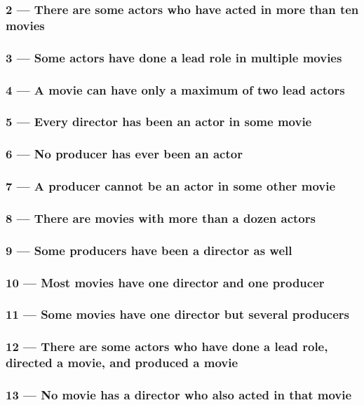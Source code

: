 \subsubsection{2 --- There are some actors who have acted in more than ten movies}

\subsubsection{3 --- Some actors have done a lead role in multiple movies}

\subsubsection{4 --- A movie can have only a maximum of two lead actors}

\subsubsection{5 --- Every director has been an actor in some movie}

\subsubsection{6 --- No producer has ever been an actor}

\subsubsection{7 --- A producer cannot be an actor in some other movie}

\subsubsection{8 --- There are movies with more than a dozen actors}

\subsubsection{9 --- Some producers have been a director as well}

\subsubsection{10 --- Most movies have one director and one producer}

\subsubsection{11 --- Some movies have one director but several producers}

\subsubsection{12 --- There are some actors who have done a lead role, directed a movie, and produced a movie}

\subsubsection{13 --- No movie has a director who also acted in that movie}

